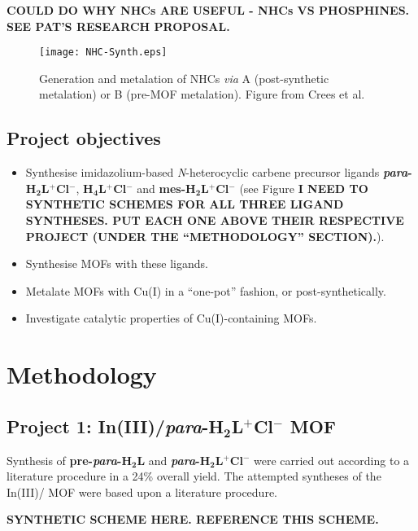 \documentclass[12pt,a4paper]{article}
\begin{document}
\textbf{COULD DO WHY NHCs ARE USEFUL - NHCs VS PHOSPHINES. SEE PAT'S RESEARCH PROPOSAL.}

\begin{figure}[h!]
\begin{center}
\texttt{[image: NHC-Synth.eps]}
\end{center}
\caption{Generation and metalation of NHCs \emph{via} A (post-synthetic metalation) or B (pre-MOF metalation). Figure from Crees et al.\cite{crees2010synthesis}}\label{NHC-Synth}
\end{figure}

\subsection{Project objectives}\label{sec:Obj}
\begin{itemize}
\item Synthesise imidazolium-based \emph{N}-heterocyclic carbene precursor ligands \textbf{\emph{para}-H$\bm{_2}$L$\bm{^+}$Cl$\bm{^-}$}, \textbf{H$\bm{_4}$L$\bm{^+}$Cl$\bm{^-}$} and \textbf{mes-H$\bm{_2}$L$\bm{^+}$Cl$\bm{^-}$} (see Figure \textbf{I NEED TO SYNTHETIC SCHEMES FOR ALL THREE LIGAND SYNTHESES. PUT EACH ONE ABOVE THEIR RESPECTIVE PROJECT (UNDER THE ``METHODOLOGY'' SECTION).}).
\item Synthesise MOFs with these ligands.
\item Metalate MOFs with Cu(I) in a ``one-pot'' fashion, or post-synthetically.
\item Investigate catalytic properties of Cu(I)-containing MOFs.
\end{itemize}

\section{Methodology}\label{sec:methods}
\subsection{Project 1: In(III)/\textbf{\emph{para}-H$\bm{_2}$L$\bm{^+}$Cl$\bm{^-}$} MOF}\label{method:p1}
Synthesis of \textbf{pre-\emph{para}-H$\bm{_2}$L} and \textbf{\emph{para}-H$\bm{_2}$L$\bm{^+}$Cl$\bm{^-}$} were carried out according to a literature procedure\cite{sen2012high} in a 24\% overall yield. The attempted syntheses of the In(III)/ MOF were based upon a literature procedure\cite{song2015periodic}.

\textbf{SYNTHETIC SCHEME HERE. REFERENCE THIS SCHEME.}
\end{document}

